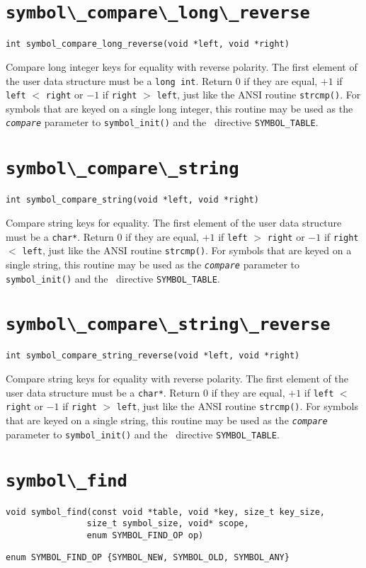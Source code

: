 \section{\protect\verb+symbol\_compare\_long\_reverse+}
\begin{verbatim}
int symbol_compare_long_reverse(void *left, void *right)
\end{verbatim}
Compare long integer keys for equality with reverse polarity. The first element of the user data
structure must be a {\tt long int}. Return 0 if they are equal, $+1$ if
{\tt left} $<$ {\tt right} or $-1$ if {\tt right} $>$ {\tt left}, just
like the ANSI routine {\tt strcmp()}. For symbols that are keyed on a
single long integer, this routine may be used as the {\tt\em compare}
parameter to \verb+symbol_init()+ and the \rdp\ directive \verb+SYMBOL_TABLE+.

\section{\protect\verb+symbol\_compare\_string+}
\begin{verbatim}
int symbol_compare_string(void *left, void *right)
\end{verbatim}
Compare string keys for equality. The first element of the user data
structure must be a {\tt char*}. Return 0 if they are equal, $+1$ if
{\tt left} $>$ {\tt right} or $-1$ if {\tt right} $<$ {\tt left}, just
like the ANSI routine {\tt strcmp()}. For symbols that are keyed on a
single string, this routine may be used as the {\tt\em compare}
parameter to \verb+symbol_init()+ and the \rdp\ directive \verb+SYMBOL_TABLE+.

\section{\protect\verb+symbol\_compare\_string\_reverse+}
\begin{verbatim}
int symbol_compare_string_reverse(void *left, void *right)
\end{verbatim}
Compare string keys for equality with reverse polarity. The first element of the user data
structure must be a {\tt char*}. Return 0 if they are equal, $+1$ if
{\tt left} $<$ {\tt right} or $-1$ if {\tt right} $>$ {\tt left}, just
like the ANSI routine {\tt strcmp()}. For symbols that are keyed on a
single string, this routine may be used as the {\tt\em compare}
parameter to \verb+symbol_init()+ and the \rdp\ directive \verb+SYMBOL_TABLE+.

\section{\protect\verb+symbol\_find+}
\begin{verbatim}
void symbol_find(const void *table, void *key, size_t key_size, 
                size_t symbol_size, void* scope, 
                enum SYMBOL_FIND_OP op)
\end{verbatim}
\begin{verbatim}
enum SYMBOL_FIND_OP {SYMBOL_NEW, SYMBOL_OLD, SYMBOL_ANY}
\end{verbatim}
